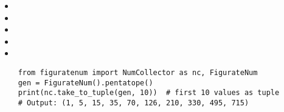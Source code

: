 \documentclass{article}
\begin{document}
\begin{multicols}{2}
    \begin{tcolorbox}[title= NumberCollector Class: Method Summary]
        \begin{itemize}[noitemsep, topsep=0pt]
            \item {}
            \item {}
            \item {}
            \item {}
            \item {}
        \end{itemize}
    \end{tcolorbox}

    \begin{tcolorbox}[title= Working with the NumberCollector Class]
        \begin{lstlisting}
    from figuratenum import NumCollector as nc, FigurateNum
    gen = FigurateNum().pentatope()
    print(nc.take_to_tuple(gen, 10))  # first 10 values as tuple
    # Output: (1, 5, 15, 35, 70, 126, 210, 330, 495, 715)
        \end{lstlisting}
    \end{tcolorbox}
\end{multicols}

\pagebreak
\end{document}

